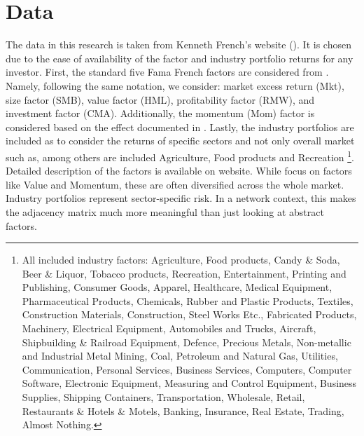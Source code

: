 \documentclass[11pt]{article}
\begin{document}
\section{Data}
\label{sec:data}
The data in this research is taken from Kenneth French's website (\cite{french2026data}). It is chosen due to the ease of availability of the factor and industry portfolio returns for any investor. First, the standard five Fama French factors are considered from \cite{fama2015five}. Namely, following the same notation, we consider:  market excess return (Mkt), size factor (SMB), value factor (HML), profitability factor (RMW), and investment factor (CMA). Additionally, the momentum (Mom) factor is considered based on the effect documented in \cite{jegadeesh1993returns}. Lastly, the industry portfolios are included as to consider the returns of specific sectors and not only overall market such as, among others  are included Agriculture, Food products and Recreation \footnote{\tiny{All included industry factors: Agriculture, Food products, Candy \& Soda, Beer \& Liquor, Tobacco products, Recreation, Entertainment, Printing and Publishing, Consumer Goods, Apparel, Healthcare, Medical Equipment, Pharmaceutical Products, Chemicals, Rubber and Plastic Products, Textiles, Construction Materials, Construction, Steel Works Etc., Fabricated Products, Machinery, Electrical Equipment, Automobiles and Trucks, Aircraft, Shipbuilding \& Railroad Equipment, Defence, Precious Metals, Non-metallic and Industrial Metal Mining, Coal, Petroleum and Natural Gas, Utilities, Communication, Personal Services, Business Services, Computers, Computer Software, Electronic Equipment, Measuring and Control Equipment, Business Supplies, Shipping Containers, Transportation, Wholesale, Retail, Restaurants \& Hotels \& Motels, Banking, Insurance, Real Estate, Trading, Almost Nothing.}}. Detailed description of the factors is available on \cite{french2026data} website. While \cite{moreira2017volatility} focus on factors like Value and Momentum, these are often diversified across the whole market. Industry portfolios represent sector-specific risk. In a network context, this makes the adjacency matrix much more meaningful than just looking at abstract factors. 
\end{document}
